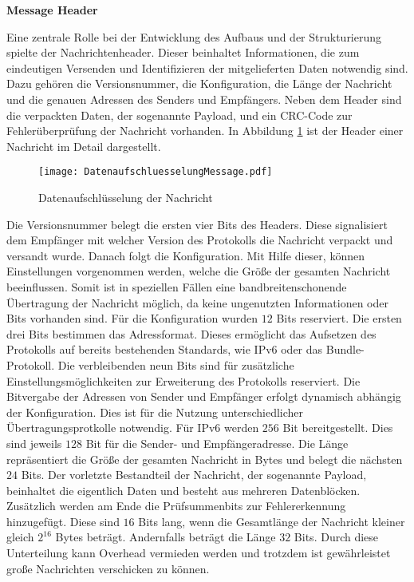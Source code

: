 \label{sec:ProtokolDesign}

\textbf{Message Header}

Eine zentrale Rolle bei der Entwicklung des Aufbaus und der Strukturierung
spielte der Nachrichtenheader.
Dieser beinhaltet Informationen, die zum eindeutigen Versenden und Identifizieren der
mitgelieferten Daten notwendig sind. Dazu gehören die Versionsnummer,
die Konfiguration, die Länge der Nachricht und die genauen Adressen
des Senders und Empfängers. Neben dem Header sind die verpackten Daten, der
sogenannte Payload, und ein CRC-Code zur Fehlerüberprüfung der Nachricht
vorhanden. In Abbildung \ref{fig:DatenaufschluesselungMessage} ist der Header
einer Nachricht im Detail dargestellt.

\begin{figure}[H]
	\centering
	\texttt{[image: DatenaufschluesselungMessage.pdf]}
	\caption{Datenaufschlüsselung der Nachricht}
	\label{fig:DatenaufschluesselungMessage}
\end{figure}

Die Versionsnummer belegt die ersten vier Bits des Headers. Diese
signalisiert dem Empfänger mit welcher Version des Protokolls die Nachricht
verpackt und versandt wurde. Danach folgt die Konfiguration. Mit Hilfe dieser,
können Einstellungen vorgenommen werden, welche die Größe der gesamten Nachricht
beeinflussen. Somit ist in speziellen Fällen eine bandbreitenschonende
Übertragung der Nachricht möglich, da keine ungenutzten Informationen oder Bits
vorhanden sind. Für die Konfiguration wurden $12$ Bits reserviert. Die ersten drei Bits
bestimmen das Adressformat. Dieses ermöglicht das Aufsetzen des Protokolls auf
bereits bestehenden Standards, wie IPv6 oder das Bundle-Protokoll.
Die verbleibenden neun Bits sind für zusätzliche Einstellungsmöglichkeiten zur Erweiterung des
Protokolls reserviert. Die Bitvergabe der Adressen von Sender und Empfänger
erfolgt dynamisch abhängig der Konfiguration.
Dies ist für die Nutzung unterschiedlicher Übertragungsprotkolle notwendig.
Für IPv6 werden $256$ Bit bereitgestellt. Dies sind jeweils $128$ Bit für
die Sender- und Empfängeradresse. Die Länge repräsentiert die Größe der gesamten
Nachricht in Bytes und belegt die nächsten $24$ Bits.
Der vorletzte Bestandteil der Nachricht, der sogenannte Payload, beinhaltet die
eigentlich Daten und besteht aus mehreren Datenblöcken. Zusätzlich werden am
Ende die Prüfsummenbits zur Fehlererkennung hinzugefügt. Diese sind $16$ Bits lang,
wenn die Gesamtlänge der Nachricht kleiner gleich $2^{16}$ Bytes beträgt.
Andernfalls beträgt die Länge $32$ Bits. Durch diese Unterteilung kann
Overhead vermieden werden und trotzdem ist gewährleistet große Nachrichten
verschicken zu können.

